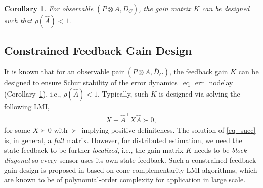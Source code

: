 \documentclass[journal]{IEEEtran}
\newtheorem{lem}{Lemma}
\newtheorem{cor}{Corollary}
\def\mc{\mathcal}
\begin{document}
\begin{cor}\label{cor_rho}
For observable $(P\otimes A, \overline{D}_C) $, the gain matrix $K$ can be designed such that  $\rho(\widehat{A})<1$. 
\end{cor}

\subsection{Constrained Feedback Gain Design}
It is known that for an observable pair $(P \otimes A, \overline{D}_C)$, the feedback gain ${K}$ can be designed to ensure Schur stability of the error dynamics~\eqref{eq_err_nodelay} (Corollary~\ref{cor_rho}), i.e., $\rho(\widehat{A})<1$. Typically, such $K$ is designed via solving the following LMI,
\begin{eqnarray} \label{eq_succ}
	X - \widehat{A}^\top X  \widehat{A} \succ 0,
\end{eqnarray}
for some $X\succ 0 $ with $\succ$ implying positive-definiteness. The solution of \eqref{eq_succ} is, in general, a \textit{full} matrix. However, for distributed estimation, we need the state feedback to be further \textit{localized}, i.e., the gain matrix ${K}$ needs to be \textit{block-diagonal} so every sensor uses its own state-feedback.  Such a constrained feedback gain design is proposed in \cite{usman_cdc:11,jstsp} based on cone-complementarity LMI algorithms, which are known to be of polynomial-order complexity for application in large scale. 

\end{document}
